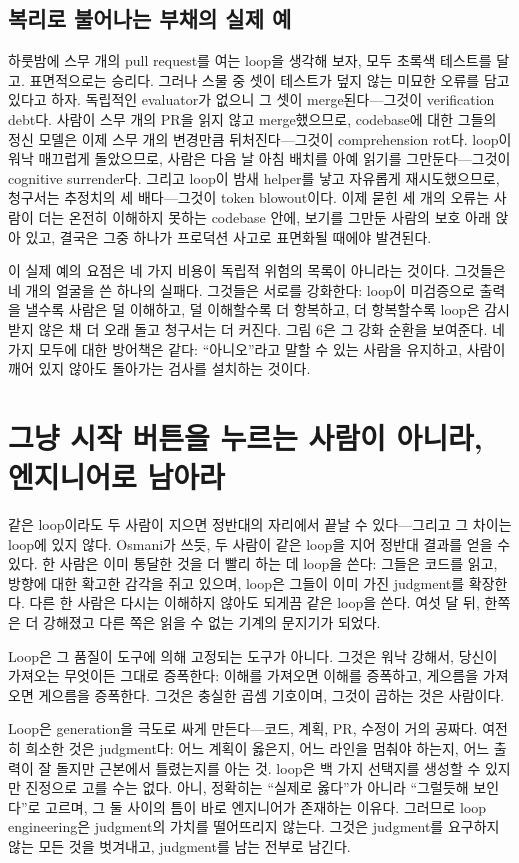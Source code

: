 \documentclass[conference]{IEEEtran}
\begin{document}
\subsection{복리로 불어나는 부채의 실제 예}
하룻밤에 스무 개의 pull request를 여는 loop을 생각해 보자, 모두 초록색 테스트를 달고. 표면적으로는 승리다. 그러나 스물 중 셋이 테스트가 덮지 않는 미묘한 오류를 담고 있다고 하자. 독립적인 evaluator가 없으니 그 셋이 merge된다---그것이 verification debt다. 사람이 스무 개의 PR을 읽지 않고 merge했으므로, codebase에 대한 그들의 정신 모델은 이제 스무 개의 변경만큼 뒤처진다---그것이 comprehension rot다. loop이 워낙 매끄럽게 돌았으므로, 사람은 다음 날 아침 배치를 아예 읽기를 그만둔다---그것이 cognitive surrender다. 그리고 loop이 밤새 helper를 낳고 자유롭게 재시도했으므로, 청구서는 추정치의 세 배다---그것이 token blowout이다. 이제 묻힌 세 개의 오류는 사람이 더는 온전히 이해하지 못하는 codebase 안에, 보기를 그만둔 사람의 보호 아래 앉아 있고, 결국은 그중 하나가 프로덕션 사고로 표면화될 때에야 발견된다.

이 실제 예의 요점은 네 가지 비용이 독립적 위험의 목록이 아니라는 것이다. 그것들은 네 개의 얼굴을 쓴 하나의 실패다. 그것들은 서로를 강화한다: loop이 미검증으로 출력을 낼수록 사람은 덜 이해하고, 덜 이해할수록 더 항복하고, 더 항복할수록 loop은 감시받지 않은 채 더 오래 돌고 청구서는 더 커진다. 그림 6은 그 강화 순환을 보여준다. 네 가지 모두에 대한 방어책은 같다: ``아니오''라고 말할 수 있는 사람을 유지하고, 사람이 깨어 있지 않아도 돌아가는 검사를 설치하는 것이다.

\section{그냥 시작 버튼을 누르는 사람이 아니라, 엔지니어로 남아라}
같은 loop이라도 두 사람이 지으면 정반대의 자리에서 끝날 수 있다---그리고 그 차이는 loop에 있지 않다. Osmani가 쓰듯, 두 사람이 같은 loop을 지어 정반대 결과를 얻을 수 있다. 한 사람은 이미 통달한 것을 더 빨리 하는 데 loop을 쓴다: 그들은 코드를 읽고, 방향에 대한 확고한 감각을 쥐고 있으며, loop은 그들이 이미 가진 judgment를 확장한다. 다른 한 사람은 다시는 이해하지 않아도 되게끔 같은 loop을 쓴다. 여섯 달 뒤, 한쪽은 더 강해졌고 다른 쪽은 읽을 수 없는 기계의 문지기가 되었다.

Loop은 그 품질이 도구에 의해 고정되는 도구가 아니다. 그것은 워낙 강해서, 당신이 가져오는 무엇이든 그대로 증폭한다: 이해를 가져오면 이해를 증폭하고, 게으름을 가져오면 게으름을 증폭한다. 그것은 충실한 곱셈 기호이며, 그것이 곱하는 것은 사람이다.

Loop은 generation을 극도로 싸게 만든다---코드, 계획, PR, 수정이 거의 공짜다. 여전히 희소한 것은 judgment다: 어느 계획이 옳은지, 어느 라인을 멈춰야 하는지, 어느 출력이 잘 돌지만 근본에서 틀렸는지를 아는 것. loop은 백 가지 선택지를 생성할 수 있지만 진정으로 고를 수는 없다. 아니, 정확히는 ``실제로 옳다''가 아니라 ``그럴듯해 보인다''로 고르며, 그 둘 사이의 틈이 바로 엔지니어가 존재하는 이유다. 그러므로 loop engineering은 judgment의 가치를 떨어뜨리지 않는다. 그것은 judgment를 요구하지 않는 모든 것을 벗겨내고, judgment를 남는 전부로 남긴다.
\end{document}
